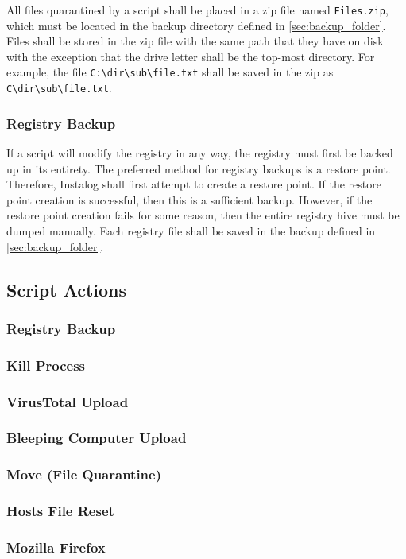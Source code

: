 All files quarantined by a script shall be placed in a zip file named
\verb|Files.zip|, which must be located in the backup directory defined in
\ref{sec:backup_folder}.  Files shall be stored in the zip file with the same
path that they have on disk with the exception that the drive letter shall be
the top-most directory.  For example, the file \verb|C:\dir\sub\file.txt| shall
be saved in the zip as \verb|C\dir\sub\file.txt|.
\subsubsection{Registry Backup} 
If a script will modify the registry in any way, the registry must first be
backed up in its entirety.  The preferred method for registry backups is a
restore point.  Therefore, Instalog shall first attempt to create a restore
point.  If the restore point creation is successful, then this is a sufficient
backup.  However, if the restore point creation fails for some reason, then the
entire registry hive must be dumped manually.  Each registry file shall be saved
in the backup defined in \ref{sec:backup_folder}.


\subsection{Script Actions}
\subsubsection{Registry Backup}
\subsubsection{Kill Process}
\subsubsection{VirusTotal Upload}
\subsubsection{Bleeping Computer Upload}
\subsubsection{Move (File Quarantine)}
\subsubsection{Hosts File Reset}
\subsubsection{Mozilla Firefox}
